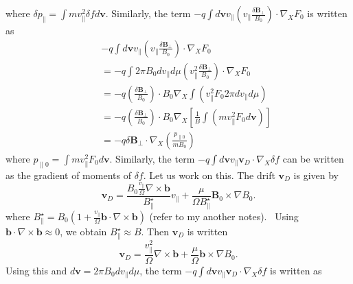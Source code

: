 \documentclass{article}
\begin{document}
where $\delta p_{\parallel} = \int m v_{\parallel}^2 \delta f d\mathbf{v}$.
Similarly, the term $- q \int d\mathbf{v}v_{\parallel} \left( v_{\parallel}
\frac{\delta \mathbf{B}_{\perp}}{B_0} \right) \cdot \nabla_X F_0$ is written
as
\begin{eqnarray}
  &  & - q \int d\mathbf{v}v_{\parallel} \left( v_{\parallel} \frac{\delta
  \mathbf{B}_{\perp}}{B_0} \right) \cdot \nabla_X F_0 \nonumber\\
  &  & = - q \int 2 \pi B_0 d v_{\parallel} d \mu \left( v_{\parallel}^2
  \frac{\delta \mathbf{B}_{\perp}}{B_0} \right) \cdot \nabla_X F_0 \nonumber\\
  &  & = - q \left( \frac{\delta \mathbf{B}_{\perp}}{B_0} \right) \cdot B_0
  \nabla_X \int (v_{\parallel}^2 F_0 2 \pi d v_{\parallel} d \mu) \nonumber\\
  &  & = - q \left( \frac{\delta \mathbf{B}_{\perp}}{B_0} \right) \cdot B_0
  \nabla_X \left[ \frac{1}{B} \int (m v_{\parallel}^2 F_0 d\mathbf{v}) \right]
  \nonumber\\
  &  & = - q \delta \mathbf{B}_{\perp} \cdot \nabla_X \left(
  \frac{p_{\parallel 0}}{m B_0} \right) 
\end{eqnarray}
where $p_{\parallel 0} = \int m v_{\parallel}^2 F_0 d\mathbf{v}$. Similarly,
the term $- q \int d\mathbf{v}v_{\parallel} \mathbf{v}_D \cdot \nabla_X \delta
f$ can be written as the gradient of moments of $\delta f$. Let us work on
this. The drift $\mathbf{v}_D$ is given by
\begin{equation}
  \mathbf{v}_D = \frac{B_0 \frac{v_{\parallel}}{\Omega} \nabla \times
  \mathbf{b}}{B^{\star}_{\parallel}} v_{\parallel} + \frac{\mu}{\Omega
  B^{\star}_{\parallel}} \mathbf{B}_0 \times \nabla B_0 .
\end{equation}
where $B^{\star}_{\parallel} = B_0 \left( 1 + \frac{v_{\parallel}}{\Omega}
\mathbf{b} \cdot \nabla \times \mathbf{b} \right)$ (refer to my another
notes). \ Using $\mathbf{b} \cdot \nabla \times \mathbf{b} \approx 0$, we
obtain $B^{\star}_{\parallel} \approx B$. Then $\mathbf{v}_D$ is written
\[ \mathbf{v}_D = \frac{v_{\parallel}^2}{\Omega} \nabla \times \mathbf{b}+
   \frac{\mu}{\Omega} \mathbf{b} \times \nabla B_0 . \]
Using this and $d\mathbf{v}= 2 \pi B_0 d v_{\parallel} d \mu$, the term $- q
\int d\mathbf{v}v_{\parallel} \mathbf{v}_D \cdot \nabla_X \delta f$ is written
as
\end{document}
